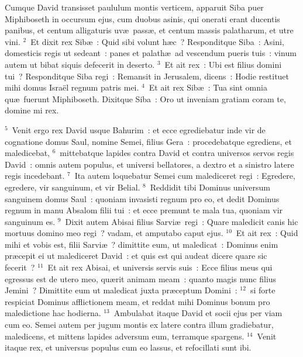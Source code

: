 \lettrine[lines=3,image=true,loversize=0.05,lraise=-0.03]{C}{}umque David transisset paululum montis verticem, apparuit Siba puer Miphiboseth in occursum ejus, cum duobus asinis, qui onerati erant ducentis panibus, et centum alligaturis uv\ae\ pass\ae , et centum massis palatharum, et utre vini.
${}^{2}$~Et dixit rex Sib\ae~: Quid sibi volunt h\ae c~? Responditque Siba~: Asini, domesticis regis ut sedeant~: panes et palath\ae\ ad vescendum pueris tuis~: vinum autem ut bibat siquis defecerit in deserto.
${}^{3}$~Et ait rex~: Ubi est filius domini tui~? Responditque Siba regi~: Remansit in Jerusalem, dicens~: Hodie restituet mihi domus Isra\"el regnum patris mei.
${}^{4}$~Et ait rex Sib\ae~: Tua sint omnia qu\ae\ fuerunt Miphiboseth. Dixitque Siba~: Oro ut inveniam gratiam coram te, domine mi rex.


${}^{5}$~Venit ergo rex David usque Bahurim~: et ecce egrediebatur inde vir de cognatione domus Saul, nomine Semei, filius Gera~: procedebatque egrediens, et maledicebat,
${}^{6}$~mittebatque lapides contra David et contra universos servos regis David~: omnis autem populus, et universi bellatores, a dextro et a sinistro latere regis incedebant.
${}^{7}$~Ita autem loquebatur Semei cum malediceret regi~: Egredere, egredere, vir sanguinum, et vir Belial.
${}^{8}$~Reddidit tibi Dominus universum sanguinem domus Saul~: quoniam invasisti regnum pro eo, et dedit Dominus regnum in manu Absalom filii tui~: et ecce premunt te mala tua, quoniam vir sanguinum es.
${}^{9}$~Dixit autem Abisai filius Sarvi\ae\ regi~: Quare maledicit canis hic mortuus domino meo regi~? vadam, et amputabo caput ejus.
${}^{10}$~Et ait rex~: Quid mihi et vobis est, filii Sarvi\ae~? dimittite eum, ut maledicat~: Dominus enim pr\ae cepit ei ut malediceret David~: et quis est qui audeat dicere quare sic fecerit~?
${}^{11}$~Et ait rex Abisai, et universis servis suis~: Ecce filius meus qui egressus est de utero meo, qu\ae rit animam meam~: quanto magis nunc filius Jemini~? Dimittite eum ut maledicat juxta pr\ae ceptum Domini~:
${}^{12}$~si forte respiciat Dominus afflictionem meam, et reddat mihi Dominus bonum pro maledictione hac hodierna.
${}^{13}$~Ambulabat itaque David et socii ejus per viam cum eo. Semei autem per jugum montis ex latere contra illum gradiebatur, maledicens, et mittens lapides adversum eum, terramque spargens.
${}^{14}$~Venit itaque rex, et universus populus cum eo lassus, et refocillati sunt ibi.



